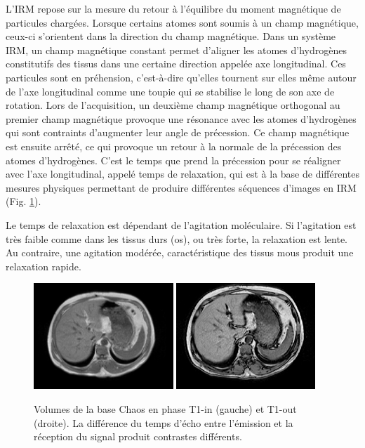 L'IRM repose sur la mesure du retour à l'équilibre du moment magnétique de particules chargées. Lorsque certains atomes sont soumis à un champ magnétique, ceux-ci s'orientent dans la direction du champ magnétique. Dans un système IRM, un champ magnétique constant permet d'aligner les atomes d'hydrogènes constitutifs des tissus dans une certaine direction appelée axe longitudinal. Ces particules sont en préhension, c'est-à-dire qu'elles tournent sur elles même autour de l'axe longitudinal comme une toupie qui se stabilise le long de son axe de rotation. Lors de l'acquisition, un deuxième champ magnétique orthogonal au premier champ magnétique provoque une résonance avec les atomes d'hydrogènes qui sont contraints d'augmenter leur angle de précession. Ce champ magnétique est ensuite arrêté, ce qui provoque un retour à la normale de la précession des atomes d'hydrogènes. C'est le temps que prend la précession pour se réaligner avec l'axe longitudinal, appelé temps de relaxation, qui est à la base de différentes mesures physiques permettant de produire différentes séquences d'images en IRM (Fig. \ref{fig:T1_MRI}).

Le temps de relaxation est dépendant de l'agitation moléculaire. Si l'agitation est très faible comme dans les tissus durs (os), ou très forte, la relaxation est lente. Au contraire, une agitation modérée, caractéristique des tissus mous produit une relaxation rapide.

\begin{figure}
    \centering
    \includegraphics[height=4cm]{Images/T1_in_phase.png}
    \includegraphics[height=4cm]{Images/T1_out_phase.png}
    \caption{Volumes de la base Chaos en phase T1-in (gauche) et T1-out (droite). La différence du temps d'écho entre l'émission et la réception du signal produit contrastes différents.}
    \label{fig:T1_MRI}
\end{figure}

